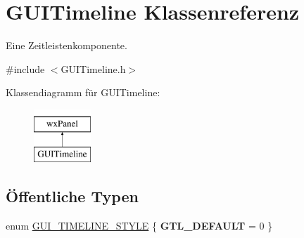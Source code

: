 \hypertarget{classGUITimeline}{\section{G\-U\-I\-Timeline Klassenreferenz}
\label{classGUITimeline}
}


Eine Zeitleistenkomponente.  




{\ttfamily \#include $<$G\-U\-I\-Timeline.\-h$>$}

Klassendiagramm für G\-U\-I\-Timeline\-:\begin{figure}[H]
\begin{center}
\leavevmode
\includegraphics[height=2.000000cm]{classGUITimeline}
\end{center}
\end{figure}
\subsection*{Öffentliche Typen}
\begin{DoxyCompactItemize}
\item 
enum \hyperlink{classGUITimeline_a56f1cf170a8c077a0b94d19a0eba8c94}{G\-U\-I\-\_\-\-T\-I\-M\-E\-L\-I\-N\-E\-\_\-\-S\-T\-Y\-L\-E} \{ {\bfseries G\-T\-L\-\_\-\-D\-E\-F\-A\-U\-L\-T} = 0
 \}
\end{DoxyCompactItemize}
